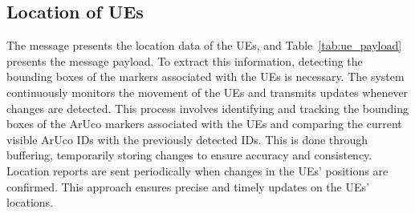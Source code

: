 \begin{table}[H]
    \caption{Components of the payload of Post Blockage message.}
    \label{tab:past_block_payload}
    \centering
\end{table}


\subsection{Location of UEs}\label{subsec:location-of-ues}
The message presents the location data of the UEs, and Table~\ref{tab:ue_payload} presents the message payload.
To extract this information, detecting the bounding boxes of the markers associated with the UEs is necessary.
The system continuously monitors the movement of the UEs and transmits updates whenever changes are detected.
This process involves identifying and tracking the bounding boxes of the ArUco markers associated with the UEs and comparing the current visible ArUco IDs with the previously detected IDs.
This is done through buffering, temporarily storing changes to ensure accuracy and consistency.
Location reports are sent periodically when changes in the UEs' positions are confirmed.
This approach ensures precise and timely updates on the UEs' locations.

\begin{table}[H]
    \caption{Components of the UE Location message payload.}
    \label{tab:ue_payload}
    \centering
\end{table}




